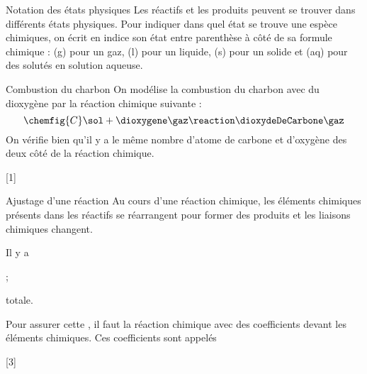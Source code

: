 \begin{doc}{Notation des états physiques}
  Les réactifs et les produits peuvent se trouver dans différents états physiques.
  Pour indiquer dans quel état se trouve une espèce chimiques, on écrit en indice son état entre parenthèse à côté de sa formule chimique : (g) pour un gaz, (l) pour un liquide, (s) pour un solide et (aq) pour des solutés en solution aqueuse.
\end{doc}


\begin{doc}{Combustion du charbon}
  On modélise la combustion du charbon avec du dioxygène par la réaction chimique suivante :
  \begin{equation*}
    \chemfig{C}\sol + \dioxygene\gaz \reaction \dioxydeDeCarbone\gaz
  \end{equation*}
  On vérifie bien qu'il y a le même nombre d'atome de carbone et d'oxygène des deux côté de la réaction chimique.
\end{doc}


[1]


\begin{doc}{Ajustage d'une réaction}
  Au cours d'une réaction chimique, les éléments chimiques présents dans les réactifs se réarrangent pour former des produits et les liaisons chimiques changent.
  \begin{importants}
    Il y a  
    \begin{listePoints}
      \item {} ;
      \item {} totale.
    \end{listePoints}
  \end{importants}
  \begin{importants}
    Pour assurer cette , il faut  la réaction chimique avec des coefficients devant les éléments chimiques.
    Ces coefficients sont appelés 
  \end{importants}
\end{doc}

[3]

